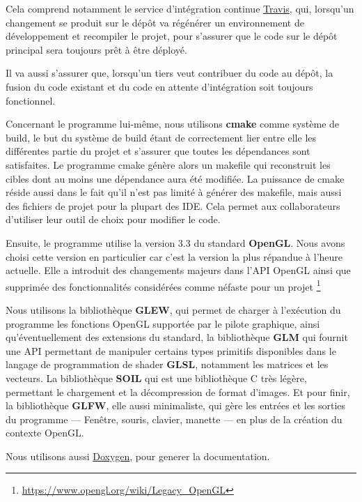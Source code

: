 \documentclass[pdftex, 11pt, a4paper, titlepage]{article}
\begin{document}
Cela comprend notamment le service d'intégration continue
\href{https://travis-ci.org/nbouteme/OpenGL-Demo}{{\color{blue}Travis}},
qui, lorsqu'un changement se produit sur le dépôt va régénérer un
environnement de développement et recompiler le projet, pour s'assurer
que le code sur le dépôt principal sera toujours prêt à être déployé.

Il va aussi s'assurer que, lorsqu'un tiers veut contribuer du code au
dépôt, la fusion du code existant et du code en attente d'intégration
soit toujours fonctionnel.

Concernant le programme lui-même, nous utilisons \textbf{cmake} comme
système de build, le but du système de build étant de correctement
lier entre elle les différentes partie du projet et s'assurer que
toutes les dépendances sont satisfaites. Le programme cmake génère
alors un makefile qui reconstruit les cibles dont au moins une
dépendance aura été modifiée. La puissance de cmake réside aussi dans
le fait qu'il n'est pas limité à générer des makefile, mais aussi des
fichiers de projet pour la plupart des IDE. Cela permet aux
collaborateurs d'utiliser leur outil de choix pour modifier le code.

Ensuite, le programme utilise la version 3.3 du standard
\textbf{OpenGL}.  Nous avons choisi cette version en particulier car
c'est la version la plus répandue à l'heure actuelle. Elle a introduit
des changements majeurs dans l'API OpenGL ainsi que supprimée des
fonctionnalités considérées comme néfaste pour un projet
\footnote{\url{https://www.opengl.org/wiki/Legacy_OpenGL}}

Nous utilisons la bibliothèque \textbf{GLEW}, qui permet de charger à
l'exécution du programme les fonctions OpenGL supportée par le pilote
graphique, ainsi qu'éventuellement des extensions du standard, la
bibliothèque \textbf{GLM} qui fournit une API permettant de manipuler
certains types primitifs disponibles dans le langage de programmation
de shader \textbf{GLSL}, notamment les matrices et les vecteurs. La
bibliothèque \textbf{SOIL} qui est une bibliothèque C très légère,
permettant le chargement et la décompression de format d'images. Et
pour finir, la bibliothèque \textbf{GLFW}, elle aussi minimaliste, qui
gère les entrées et les sorties du programme --- Fenêtre, souris,
clavier, manette --- en plus de la création du contexte OpenGL.

Nous utilisons aussi \href{https://nbouteme.github.io/OpenGL-Demo/docs}{{\color{blue}Doxygen}},
 pour generer la documentation.
\end{document}
